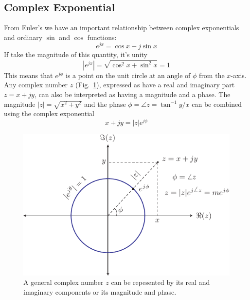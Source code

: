\subsection{Complex Exponential}
From Euler's we have an important relationship between complex exponentials and ordinary $\sin$ and $\cos$ functions:
    \begin{equation}
        e^{j x} = \cos x + j \sin x
    \end{equation}
If take the magnitude of this quantity, it's unity
    \begin{equation}
        | e^{j x} | = \sqrt{\cos^2 x +  \sin^2 x}  = 1
    \end{equation}
This means that $e^{j\phi}$ is a point on the unit circle at an angle of $\phi$ from the $x$-axis. 
Any complex number $z$ (Fig.~\ref{fig:complex}), expressed as have a real and imaginary part $ z = x + j y$, can also be interpreted as having a magnitude and a phase.  The magnitude  $|z| = \sqrt{x^2 + y^2}$ and the phase $\phi = \angle z = \tan^{-1} y/x$ can be combined using the complex exponential
    \begin{equation}
        x + j y = |z| e^{j\phi}
    \end{equation}
\begin{figure}[tb]
\begin{center}
\includegraphics[width=.6\columnwidth]{complex}
\end{center}
\caption{A general complex number $z$ can be repesented by its real and imaginary components or its magnitude and phase. } \label{fig:complex}
\end{figure}
